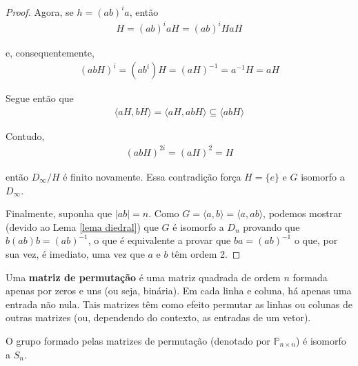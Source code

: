 \begin{proof}
		\par\vspace{0.3cm} Agora, se $h = (ab)^ia$, então
		\begin{align*}
		    H = (ab)^iaH = (ab)^iHaH
		\end{align*}
		\par\vspace{0.3cm} e, consequentemente, 
		\begin{align*}
		    (abH)^i = (ab^i)H = (aH)^{-1} = a^{-1}H = aH
		\end{align*}
		\par\vspace{0.3cm} Segue então que
		\begin{align*}
		    \langle aH, bH \rangle = \langle aH, abH \rangle\subseteq \langle abH \rangle
		\end{align*}
		\par\vspace{0.3cm} Contudo, 
		\begin{align*}
		    (abH)^{2i} = (aH)^2 = H
		\end{align*}
		\par\vspace{0.3cm} então $D_{\infty}/H$ é finito novamente. Essa contradição força 
		$H = \{e\}$ e $G$ isomorfo a $D_{\infty}$.
		
		\par\vspace{0.3cm} Finalmente, suponha que $|ab| = n$. Como $G = \langle a,b \rangle 
		= \langle a,ab \rangle$, podemos mostrar (devido ao Lema \eqref{lema diedral}) que $G$ é isomorfo 
		a $D_n$ provando que $b(ab)b = (ab)^{-1}$, o que é equivalente a provar que $ba = (ab)^{-1}$ o que, 
		por sua vez, é imediato, uma vez que $a$ e $b$ têm ordem 2.
	\end{proof}
	\begin{deff}
		Uma \textbf{matriz de permutação} é uma matriz quadrada de ordem $n$ formada apenas por zeros 
		e uns (ou seja, binária). Em cada linha e coluna, há apenas uma entrada não nula. Tais matrizes 
		têm como efeito permutar as linhas ou colunas de outras matrizes (ou, dependendo do contexto, as 
		entradas de um vetor).
	\end{deff}
	\begin{lemma}
	\label{matrizes de permutacao}
		O grupo formado pelas matrizes de permutação (denotado por $\mathbb{P}_{n\times n}$) é isomorfo a $S_n$.
	\end{lemma}
